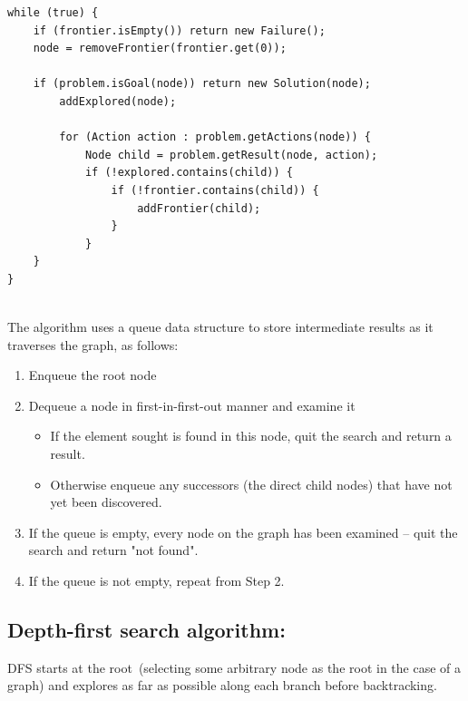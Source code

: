 \documentclass[a4paper]{article}
\begin{document}
\begin{lstlisting}
while (true) {
    if (frontier.isEmpty()) return new Failure();
    node = removeFrontier(frontier.get(0));

    if (problem.isGoal(node)) return new Solution(node);
        addExplored(node);

        for (Action action : problem.getActions(node)) {
            Node child = problem.getResult(node, action);
            if (!explored.contains(child)) {
                if (!frontier.contains(child)) {
                    addFrontier(child);
                }
            }
    }
}
\end{lstlisting}

\noindent \\
The algorithm uses a queue data structure to store intermediate results as it traverses the graph, as follows:\\

\begin{enumerate}
\item Enqueue the root node
\item Dequeue a node in first-in-first-out manner and examine it
	\begin{itemize}
		\item If the element sought is found in this node, quit the search and return a result.
		\item Otherwise enqueue any successors (the direct child nodes) that have not yet been discovered.
	\end{itemize}
\item If the queue is empty, every node on the graph has been examined – quit the search and return "not found". \\
\item If the queue is not empty, repeat from Step 2.
\end{enumerate}


\subsection{Depth-first search algorithm:}

DFS starts at the root (selecting some arbitrary node as the root in the case of a graph) and explores as far as possible along each branch before backtracking.
\end{document}
